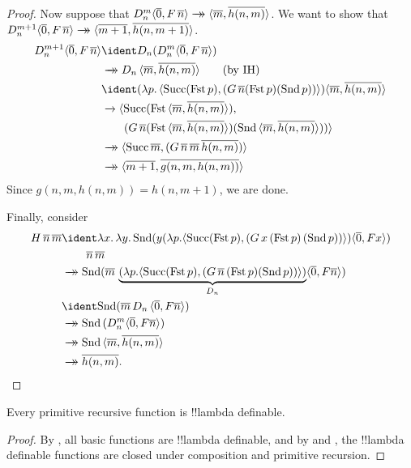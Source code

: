 \documentclass[../../../include/open-logic-section]{subfiles}
\begin{document}
\begin{proof}
  Now suppose that $D_n^m \tuple{\num{0}, F\, \num{n}} \red
  \tuple{\num{m}, \num{h(n, m)}}$. We want to
  show that $D_n^{m+1} \tuple{\num{0}, F\, \num{n}} \red
  \tuple{\num{m+1}, \num{h(n, m+1)}}$.
  \begin{align*}
    D_n^{m+1} \tuple{\num{0}, F\, \num{n}}
    & \ident D_n(D_n^{m} \tuple{\num{0}, F\, \num{n}})\\
    & \red D_n\,\tuple{\num{m}, \num{h(n, m)}} \text{\qquad (by IH)}\\
    & \ident (\lambd[p][
      \tuple{
        \fn{Succ} (\fn{Fst}\, p), (G \, \num{n} (\fn{Fst}\, p) (\fn{Snd}\, p))
    }]) \tuple{\num{m}, \num{h(n,m)}}\\
    & \redone
    \tuple{\fn{Succ} (\fn{Fst}\, \tuple{\num{m}, \num{h(n,m)}}),\\
      & \qquad (G \, \num{n} (\fn{Fst}\, \tuple{\num{m}, \num{h(n,m)}}) (\fn{Snd}\, \tuple{\num{m}, \num{h(n,m)}}))}\\
    & \red 
    \tuple{\fn{Succ}\, \num{m}, (G \, \num{n} \,\num{m} \, \num{h(n,m)})}\\
    & \red \tuple{\num{m+1}, \num{g(n, m, h(n, m))}}
  \end{align*}
  Since $g(n, m, h(n, m)) = h(n, m+1)$, we are done.

  Finally, consider
  \begin{align*}
    H\,\num n\,\num m &\ident \lambd[x][\lambd[y][\fn{Snd} (y
        (\lambd[p].\tuple{\fn{Succ} (\fn{Fst}\, p), (G\, x\,
          (\fn{Fst}\, p)\, (\fn{Snd}\, p))}) \tuple{\num{0}, F x})]]\\
    & \qquad\,\num n\, \num m\\
    & \red \fn{Snd} (\num m \,
    \underbrace{(\lambd[p].\tuple{\fn{Succ} (\fn{Fst}\, p), (G \,\num n\,
      (\fn{Fst}\, p) (\fn{Snd}\, p))})}_{D_n} \tuple{\num{0}, F \num n})\\
    & \ident \fn{Snd} (\num m \, D_n\, \tuple{\num{0}, F \num n})\\
    & \red \fn{Snd} \,(D_n^m  \tuple{\num{0}, F \num n})\\
    & \red \fn{Snd} \,\tuple{\num{m}, \num{h(n, m)}} \\
    & \red \num{h(n,m)}. 
  \end{align*}  
\end{proof}


\begin{prop}
  Every primitive recursive function is !!{lambda definable}.
\end{prop}

\begin{proof}
  By , all basic functions are !!{lambda definable},
  and by  and , the !!{lambda definable}
  functions are closed under composition and primitive recursion.
\end{proof}
\end{document}
